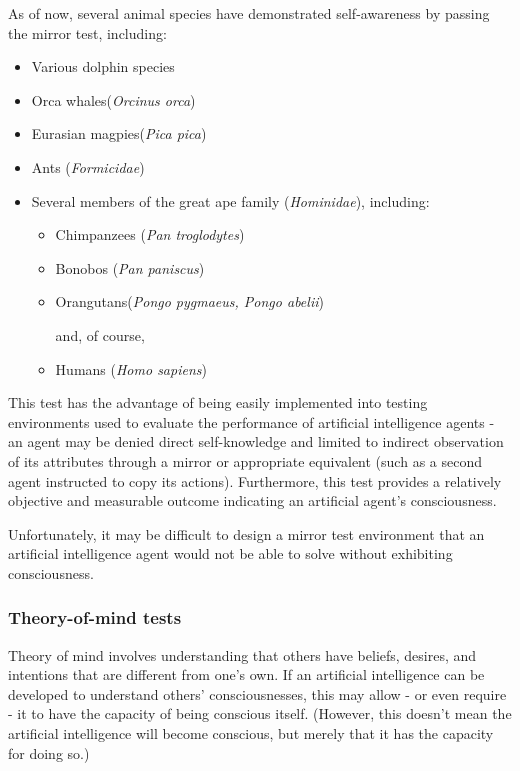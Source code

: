 \documentclass[masterthesis]{fer}
\begin{document}
As of now, several animal species have demonstrated self-awareness by passing the mirror test, including:
\begin{itemize}
\item Various dolphin species
\item Orca whales(\textit{Orcinus orca})
\item Eurasian magpies(\textit{Pica pica})
\item Ants (\textit{Formicidae})
\item Several members of the great ape family (\textit{Hominidae}), including:
\begin{itemize}
\item Chimpanzees (\textit{Pan troglodytes})
\item Bonobos (\textit{Pan paniscus})
\item Orangutans(\textit{Pongo pygmaeus, Pongo abelii})

and, of course,
\item Humans (\textit{Homo sapiens})
\end{itemize}
\end{itemize}

This test has the advantage of being easily implemented into testing environments used to evaluate the performance of artificial intelligence agents - an agent may be denied direct self-knowledge and limited to indirect observation of its attributes through a mirror or appropriate equivalent (such as a second agent instructed to copy its actions).
Furthermore, this test provides a relatively objective and measurable outcome indicating an artificial agent's consciousness.

Unfortunately, it may be difficult to design a mirror test environment that an artificial intelligence agent would not be able to solve without exhibiting consciousness.

\subsubsection{Theory-of-mind tests}

Theory of mind involves understanding that others have beliefs, desires, and intentions that are different from one's own. If an artificial intelligence can be developed to understand others' consciousnesses, this may allow - or even require - it to have the capacity of being conscious itself. (However, this doesn't mean the artificial intelligence will become conscious, but merely that it has the capacity for doing so.)
\end{document}
